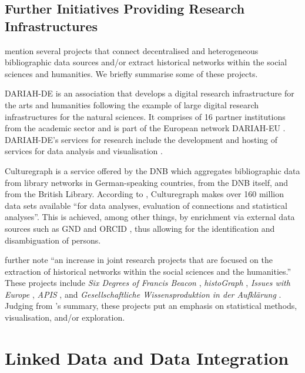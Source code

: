 \subsection{Further Initiatives Providing Research Infrastructures}

\textcite{Menzel2020} mention several projects that connect
decentralised and heterogeneous bibliographic data sources
and/or extract historical networks within the social sciences and humanities.
We briefly summarise some of these projects.

DARIAH-DE \autocite{DariahDE} is an association that develops
a digital research infrastructure for the arts and humanities
following the example of large digital research infrastructures for the natural sciences.
It comprises of 16 partner institutions from the academic sector
and is part of the European network DARIAH-EU \autocite{DariahEU}.
DARIAH-DE's services for research include
the development and hosting of services for data analysis and visualisation
\autocite{WikiDariahDE}.

Culturegraph \autocite{Vorndran2018,Culturegraph} is a service offered by the
\gls{DNB} which aggregates bibliographic data 
from library networks in German-speaking countries,
from the \gls{DNB} itself, and from the British Library.
According to \textcite{Vorndran2018}, Culturegraph makes over 160 million data sets
available \enquote{for data analyses, evaluation of connections and statistical analyses}.
This is achieved, among other things,
by enrichment via external data sources such as \gls{GND}
and ORCID \autocite{ORCID}, thus allowing for the identification
and disambiguation of persons.

\textcite{Menzel2020} further note \enquote{an increase in joint research projects
that are focused on the extraction of historical networks within the social sciences and the humanities.}
These projects include \emph{Six Degrees of Francis Beacon} \autocite{Warren2016,SixDegreesFB},
\emph{histoGraph} \autocite{Novak2014,histograph},
\emph{Issues with Europe} \autocite{IssuesWithEurope},
\emph{APIS} \autocite{Gruber2017,APIS},
and \emph{Gesellschaftliche Wissensproduktion in der Aufklärung} \autocite{Purschwitz2018}.
Judging from \citeauthor*{Menzel2020}'s \autocite*{Menzel2020} summary,
these projects put an emphasis on statistical methods,
visualisation, and/or exploration.

\section{Linked Data and Data Integration}
\label{sec:linked_data+integration}

